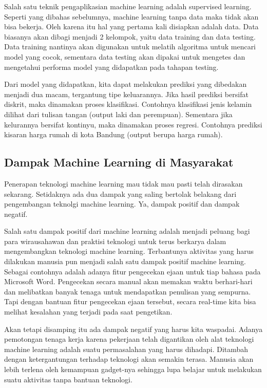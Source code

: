 Salah satu teknik pengaplikasian machine learning adalah supervised learning. Seperti yang dibahas sebelumnya, machine learning tanpa data maka tidak akan bisa bekerja. Oleh karena itu hal yang pertama kali disiapkan adalah data. Data biasanya akan dibagi menjadi 2 kelompok, yaitu data training dan data testing. Data training nantinya akan digunakan untuk melatih algoritma untuk mencari model yang cocok, sementara data testing akan dipakai untuk mengetes dan mengetahui performa model yang didapatkan pada tahapan testing.
\par Dari model yang didapatkan, kita dapat melakukan prediksi yang dibedakan menjadi dua macam, tergantung tipe keluarannya. Jika hasil prediksi bersifat diskrit, maka dinamakan proses klasifikasi. Contohnya klasifikasi jenis kelamin dilihat dari tulisan tangan (output laki dan perempuan). Sementara jika kelurannya bersifat kontinyu, maka dinamakan proses regresi. Contohnya prediksi kisaran harga rumah di kota Bandung (output berupa harga rumah).

\subsection{Dampak Machine Learning di Masyarakat}
Penerapan teknologi machine learning mau tidak mau pasti telah dirasakan sekarang. Setidaknya ada dua dampak yang saling bertolak belakang dari pengembangan teknolgi machine learning. Ya, dampak positif dan dampak negatif.
\par Salah satu dampak positif dari machine learning adalah menjadi peluang bagi para wirausahawan dan praktisi teknologi untuk terus berkarya dalam mengembangkan teknologi machine learning. Terbantunya aktivitas yang harus dilakukan manusia pun menjadi salah satu dampak positif machine learning. Sebagai contohnya adalah adanya fitur pengecekan ejaan untuk tiap bahasa pada Microsoft Word. Pengecekan secara manual akan memakan waktu berhari-hari dan melibatkan banyak tenaga untuk mendapatkan penulisan yang sempurna. Tapi dengan bantuan fitur pengecekan ejaan tersebut, secara real-time kita bisa melihat kesalahan yang terjadi pada saat pengetikan.
\par Akan tetapi disamping itu ada dampak negatif yang harus kita waspadai. Adanya pemotongan tenaga kerja karena pekerjaan telah digantikan oleh alat teknologi machine learning adalah suatu permasalahan yang harus dihadapi. Ditambah dengan ketergantungan terhadap teknologi akan semakin terasa. Manusia akan lebih terlena oleh kemampuan gadget-nya sehingga lupa belajar untuk melakukan suatu aktivitas tanpa bantuan teknologi.